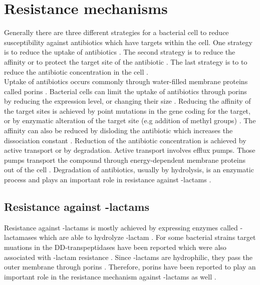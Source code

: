 \section{Resistance mechanisms}
Generally there are three different strategies for a bacterial cell to reduce susceptibility against antibiotics which have targets within the cell. One strategy is to reduce the uptake of antibiotics \cite{barreteau_cytoplasmic_2008}. The second strategy is to reduce the affinity or to protect the target site of the antibiotic \cite{munita_mechanisms_2016}. The last strategy is to  to reduce the antibiotic concentration in the cell \cite{munita_mechanisms_2016}.\\
Uptake of antibiotics occurs commonly through water-filled membrane proteins called porins \cite{fernandez_adaptive_2012}. Bacterial cells can limit the uptake of antibiotics through porins by reducing the expression level, or changing their size \cite{fernandez_adaptive_2012}.
Reducing the affinity of the target sites is achieved by point mutations in the gene coding for the target, or by enzymatic alteration of the target site (e.g addition of methyl groups) \cite{munita_mechanisms_2016}. The affinity can also be reduced by disloding the antibiotic which increases the dissociation constant \cite{connell_ribosomal_2003}.
Reduction of the antibiotic concentration is achieved by active transport or by degradation. Active transport involves efflux pumps. Those pumps transport the compound through energy-dependent membrane proteins out of the cell \cite{fernandez_adaptive_2012}. Degradation of antibiotics, usually by hydrolysis, is an enzymatic process and plays an important role in resistance against \textbeta-lactams \cite{poole_resistance_2004}.  
\subsection{Resistance against \textbeta-lactams}
Resistance against \textbeta-lactams is mostly achieved by expressing enzymes called \textbeta-lactamases which are able to hydrolyze \textbeta-lactam \cite{poole_resistance_2004}. For some bacterial strains target muations in the DD-transpeptidases have been reported which were also associated with \textbeta-lactam resistance \cite{poole_resistance_2004}. Since \textbeta-lactams are hydrophilic, they pass the outer membrane through porins \cite{munita_mechanisms_2016}. Therefore, porins have been reported to play an important role in the resistance mechanism against \textbeta-lactams as well \cite{poole_resistance_2004}.

